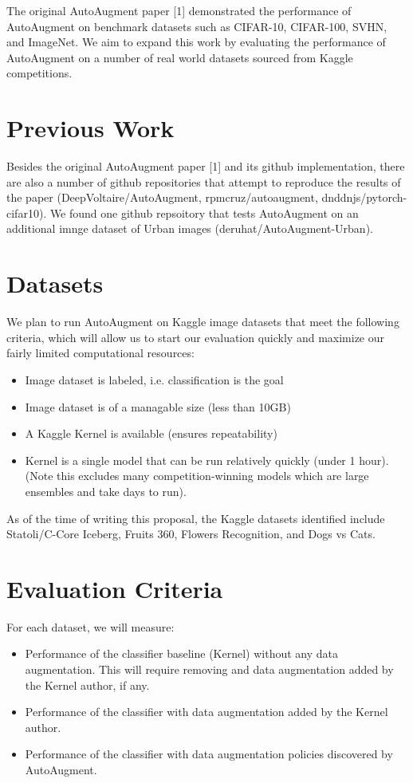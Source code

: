 \documentclass[10pt,twocolumn,letterpaper]{article}
\begin{document}
The original AutoAugment paper [1] demonstrated the performance of AutoAugment on benchmark datasets such as CIFAR-10, CIFAR-100, SVHN, and ImageNet. We aim to expand this work by evaluating the performance of AutoAugment on a number of real world datasets sourced from Kaggle competitions. 

\section{Previous Work}

Besides the original AutoAugment paper [1] and its github implementation, there are also a number of github repositories that attempt to reproduce the results of the paper (DeepVoltaire/AutoAugment, rpmcruz/autoaugment, dnddnjs/pytorch-cifar10).  We found one github repsoitory that tests AutoAugment on an additional imnge dataset of Urban images (deruhat/AutoAugment-Urban). 


\section{Datasets}

We plan to run AutoAugment on Kaggle image datasets that meet the following criteria, which will allow us to start our evaluation quickly and maximize our fairly limited computational resources:
\begin{itemize}
  \item Image dataset is labeled, i.e. classification is the goal
  \item Image dataset is of a managable size (less than 10GB)
  \item A Kaggle Kernel is available (ensures repeatability)
  \item Kernel is a single model that can be run relatively quickly (under 1 hour).  (Note this excludes many competition-winning models which are large ensembles and take days to run).
\end{itemize}

As of the time of writing this proposal, the Kaggle datasets identified include Statoli/C-Core Iceberg, Fruits 360, Flowers Recognition, and Dogs vs Cats.


\section{Evaluation Criteria}

For each dataset, we will measure:
\begin{itemize}
  \item Performance of the classifier baseline (Kernel) without any data augmentation.  This will require removing and data augmentation added by the Kernel author, if any.
  \item Performance of the classifier with data augmentation added by the Kernel author.
  \item Performance of the classifier with data augmentation policies discovered by AutoAugment.
\end{itemize}
\end{document}
